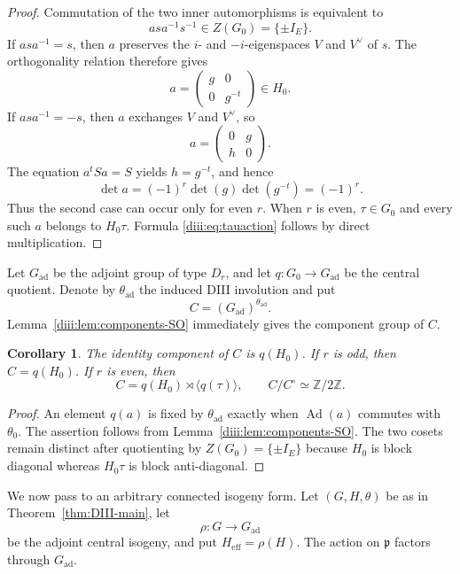 \documentclass[11pt,reqno]{amsart}
\numberwithin{equation}{section}
\newtheorem{corollary}[theorem]{Corollary}
\theoremstyle{definition}
\theoremstyle{remark}
\newcommand{\Ad}{\operatorname{Ad}}
\newcommand{\fp}{\mathfrak p}
\begin{document}
\begin{proof}
Commutation of the two inner automorphisms is equivalent to
\[
  asa^{-1}s^{-1}\in Z(G_0)=\{\pm I_E\}.
\]
If $asa^{-1}=s$, then $a$ preserves the $i$- and $-i$-eigenspaces $V$ and
$V^\vee$ of $s$.  The orthogonality relation therefore gives
\[
  a=\begin{pmatrix}g&0\\0&g^{-t}\end{pmatrix}\in H_0.
\]
If $asa^{-1}=-s$, then $a$ exchanges $V$ and $V^\vee$, so
\[
  a=\begin{pmatrix}0&g\\h&0\end{pmatrix}.
\]
The equation $a^tSa=S$ yields $h=g^{-t}$, and hence
\[
  \det a=(-1)^r\det(g)\det(g^{-t})=(-1)^r.
\]
Thus the second case can occur only for even $r$.  When $r$ is even, $\tau\in G_0$ and every such $a$ belongs to $H_0\tau$.  Formula \eqref{diii:eq:tauaction} follows by direct multiplication.
\end{proof}

Let $G_{\mathrm{ad}}$ be the adjoint group of type $D_r$, and let
$q:G_0\to G_{\mathrm{ad}}$ be the central quotient.  Denote by
$\theta_{\mathrm{ad}}$ the induced DIII involution and put
\[
  C=(G_{\mathrm{ad}})^{\theta_{\mathrm{ad}}}.
\]
Lemma~\ref{diii:lem:components-SO} immediately gives the component group of $C$.

\begin{corollary}\label{diii:cor:Ccomponents}
The identity component of $C$ is $q(H_0)$.  If $r$ is odd, then
$C=q(H_0)$.  If $r$ is even, then
\[
  C=q(H_0)\rtimes\langle q(\tau)\rangle,
  \qquad C/C^\circ\simeq\mathbb Z/2\mathbb Z.
\]
\end{corollary}

\begin{proof}
An element $q(a)$ is fixed by $\theta_{\mathrm{ad}}$ exactly when
$\Ad(a)$ commutes with $\theta_0$.  The assertion follows from
Lemma~\ref{diii:lem:components-SO}.  The two cosets remain distinct after quotienting by $Z(G_0)=\{\pm I_E\}$ because $H_0$ is block diagonal whereas $H_0\tau$ is block anti-diagonal.
\end{proof}

We now pass to an arbitrary connected isogeny form.  Let $(G,H,\theta)$ be as in Theorem~\ref{thm:DIII-main}, let
\[
  \rho:G\longrightarrow G_{\mathrm{ad}}
\]
be the adjoint central isogeny, and put $H_{\mathrm{eff}}=\rho(H)$.  The action on $\fp$ factors through $G_{\mathrm{ad}}$.
\end{document}
